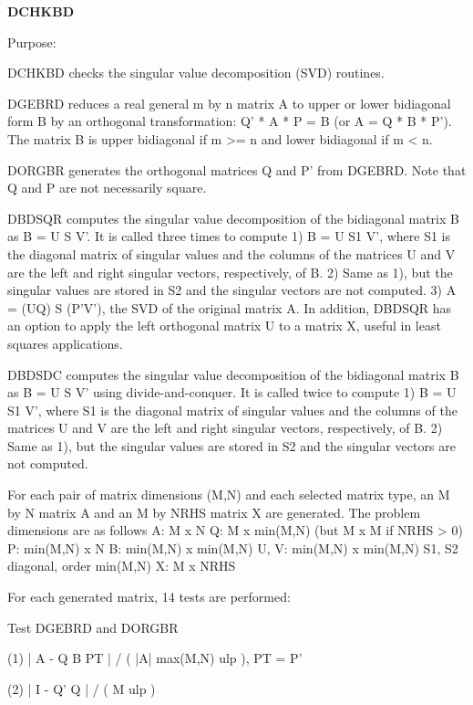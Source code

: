 {\bfseries D\+C\+H\+K\+B\+D} 

\begin{DoxyParagraph}{Purpose\+: }
\begin{DoxyVerb} DCHKBD checks the singular value decomposition (SVD) routines.

 DGEBRD reduces a real general m by n matrix A to upper or lower
 bidiagonal form B by an orthogonal transformation:  Q' * A * P = B
 (or A = Q * B * P').  The matrix B is upper bidiagonal if m >= n
 and lower bidiagonal if m < n.

 DORGBR generates the orthogonal matrices Q and P' from DGEBRD.
 Note that Q and P are not necessarily square.

 DBDSQR computes the singular value decomposition of the bidiagonal
 matrix B as B = U S V'.  It is called three times to compute
    1)  B = U S1 V', where S1 is the diagonal matrix of singular
        values and the columns of the matrices U and V are the left
        and right singular vectors, respectively, of B.
    2)  Same as 1), but the singular values are stored in S2 and the
        singular vectors are not computed.
    3)  A = (UQ) S (P'V'), the SVD of the original matrix A.
 In addition, DBDSQR has an option to apply the left orthogonal matrix
 U to a matrix X, useful in least squares applications.

 DBDSDC computes the singular value decomposition of the bidiagonal
 matrix B as B = U S V' using divide-and-conquer. It is called twice
 to compute
    1) B = U S1 V', where S1 is the diagonal matrix of singular
        values and the columns of the matrices U and V are the left
        and right singular vectors, respectively, of B.
    2) Same as 1), but the singular values are stored in S2 and the
        singular vectors are not computed.

 For each pair of matrix dimensions (M,N) and each selected matrix
 type, an M by N matrix A and an M by NRHS matrix X are generated.
 The problem dimensions are as follows
    A:          M x N
    Q:          M x min(M,N) (but M x M if NRHS > 0)
    P:          min(M,N) x N
    B:          min(M,N) x min(M,N)
    U, V:       min(M,N) x min(M,N)
    S1, S2      diagonal, order min(M,N)
    X:          M x NRHS

 For each generated matrix, 14 tests are performed:

 Test DGEBRD and DORGBR

 (1)   | A - Q B PT | / ( |A| max(M,N) ulp ), PT = P'

 (2)   | I - Q' Q | / ( M ulp )


\end{DoxyVerb}
\end{DoxyParagraph}
